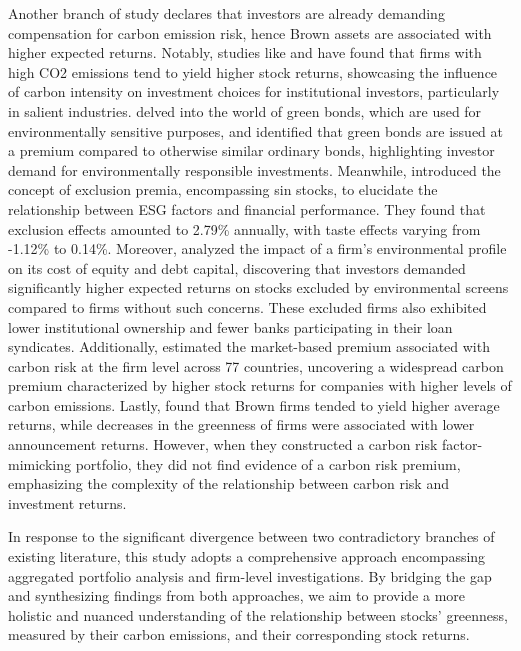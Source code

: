 \documentclass[12pt]{article}
\begin{document}
Another branch of study declares that investors are already demanding compensation for carbon emission risk, hence Brown assets are associated with higher expected returns. Notably, studies like \cite{bolton2021investors} and \cite{aswani2023carbon} have found that firms with high CO2 emissions tend to yield higher stock returns, showcasing the influence of carbon intensity on investment choices for institutional investors, particularly in salient industries. \cite{baker2018financing} delved into the world of green bonds, which are used for environmentally sensitive purposes, and identified that green bonds are issued at a premium compared to otherwise similar ordinary bonds, highlighting investor demand for environmentally responsible investments. Meanwhile, \cite{zerbib2022sustainable} introduced the concept of exclusion premia, encompassing sin stocks, to elucidate the relationship between ESG factors and financial performance. They found that exclusion effects amounted to 2.79\% annually, with taste effects varying from -1.12\% to 0.14\%. Moreover, \cite{chava2014environmental} analyzed the impact of a firm's environmental profile on its cost of equity and debt capital, discovering that investors demanded significantly higher expected returns on stocks excluded by environmental screens compared to firms without such concerns. These excluded firms also exhibited lower institutional ownership and fewer banks participating in their loan syndicates. Additionally, \cite{bolton2021global} estimated the market-based premium associated with carbon risk at the firm level across 77 countries, uncovering a widespread carbon premium characterized by higher stock returns for companies with higher levels of carbon emissions. Lastly, \cite{gorgen2020carbon} found that Brown firms tended to yield higher average returns, while decreases in the greenness of firms were associated with lower announcement returns. However, when they constructed a carbon risk factor-mimicking portfolio, they did not find evidence of a carbon risk premium, emphasizing the complexity of the relationship between carbon risk and investment returns.

In response to the significant divergence between two contradictory branches of existing literature, this study adopts a comprehensive approach encompassing aggregated portfolio analysis and firm-level investigations. By bridging the gap and synthesizing findings from both approaches, we aim to provide a more holistic and nuanced understanding of the relationship between stocks' greenness, measured by their carbon emissions, and their corresponding stock returns.
\end{document}
